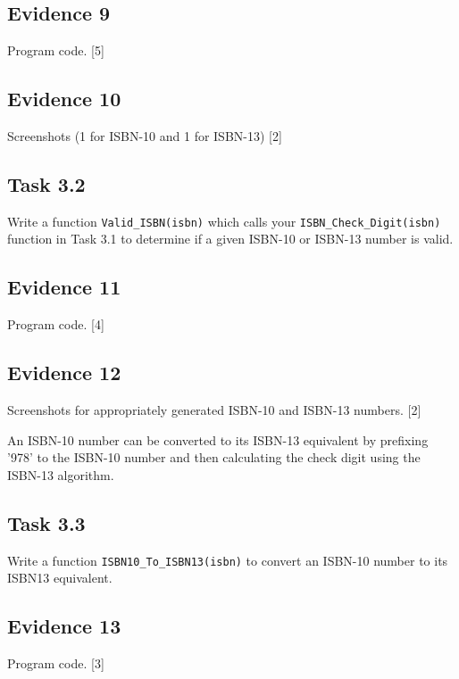 \subsection*{Evidence 9 }

Program code. \hfill{}{[}5{]}

\subsection*{Evidence 10 }

Screenshots (1 for ISBN-10 and 1 for ISBN-13)\hfill{} {[}2{]}

\subsection*{Task 3.2 }

Write a function \texttt{Valid\_ISBN(isbn)} which calls your \texttt{ISBN\_Check\_Digit(isbn)}
function in Task 3.1 to determine if a given ISBN-10 or ISBN-13 number
is valid. 

\subsection*{Evidence 11 }

Program code. \hfill{}{[}4{]}

\subsection*{Evidence 12 }

Screenshots for appropriately generated ISBN-10 and ISBN-13 numbers.\hfill{}
{[}2{]}

An ISBN-10 number can be converted to its ISBN-13 equivalent by prefixing
'978' to the ISBN-10 number and then calculating the check digit using
the ISBN-13 algorithm. 

\subsection*{Task 3.3 }

Write a function \texttt{ISBN10\_To\_ISBN13(isbn)} to convert an ISBN-10
number to its ISBN13 equivalent.

\subsection*{Evidence 13 }

Program code. \hfill{}{[}3{]}

